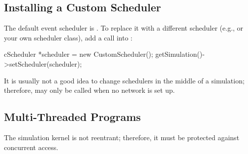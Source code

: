 \subsection{Installing a Custom Scheduler}
\label{sec:embedding:installing-a-custom-scheduler}

The default event scheduler is . To replace
it with a different scheduler (e.g.,  or your
own scheduler class), add a  call into :

\begin{cpp}
cScheduler *scheduler = new CustomScheduler();
getSimulation()->setScheduler(scheduler);
\end{cpp}

It is usually not a good idea to change schedulers in the middle of
a simulation; therefore,  may only be called when
no network is set up.


\subsection{Multi-Threaded Programs}
\label{sec:embedding:multi-threaded-programs}

The {\opp} simulation kernel is not reentrant; therefore, it must be protected
against concurrent access.



